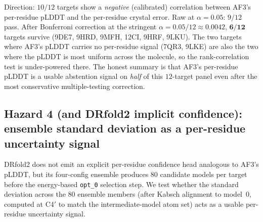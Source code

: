 \documentclass[11pt,a4paper]{article}
\begin{document}
Direction: $10/12$ targets show a \emph{negative} (calibrated)
correlation between AF3's per-residue pLDDT and the per-residue
crystal error. Raw at $\alpha=0.05$: $9/12$ pass. After Bonferroni
correction at the stringent $\alpha=0.05/12 \approx 0.0042$,
$\mathbf{6/12}$ targets survive (9DE7, 9HRD, 9MFH, 12CI, 9HRF,
9LKU). The two targets where AF3's pLDDT carries no per-residue
signal (7QR3, 9LKE) are also the two where the pLDDT is most
uniform across the molecule, so the rank-correlation test is
under-powered there. The honest summary is that AF3's per-residue
pLDDT is a usable abstention signal on \emph{half} of this $12$-target
panel even after the most conservative multiple-testing correction.

\subsection{Hazard 4 (and DRfold2 implicit confidence):
ensemble standard deviation as a per-residue uncertainty signal}
\label{sec:ensemble}

DRfold2 does not emit an explicit per-residue confidence head
analogous to AF3's pLDDT, but its four-config ensemble produces
$80$ candidate models per target before the energy-based
\texttt{opt\_0} selection step. We test whether the standard
deviation across the $80$ ensemble members (after Kabsch alignment
to model~$0$, computed at C4$'$ to match the intermediate-model
atom set) acts as a usable per-residue uncertainty signal.
\end{document}
